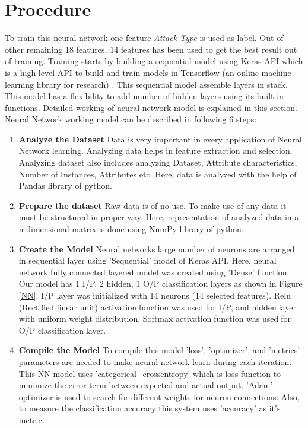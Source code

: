 \section{Procedure} \label{Procedure}
 To train this neural network one feature \textit{Attack Type} is used as label. Out of other remaining 18 features, 14 features has been used to get the best result out of training. Training starts by building a sequential model using Keras API which is a high-level API to build and train models in Tensorflow (an online machine learning library for research) . This sequential model assemble layers in stack. This model has a flexibility to add number of hidden layers using its built in functions. Detailed working of neural network model is explained in this section.
Neural Network working model can be described in following 6 steps:
\begin{enumerate}[label=\textbf{\roman*}.]
\item \textbf{Analyze the Dataset } Data is very important in every application of Neural Network learning. Analyzing data helps in feature extraction and selection. Analyzing dataset also includes analyzing Dataset, Attribute characteristics, Number of Instances, Attributes etc. Here, data is analyzed with the help of Pandas library of python. 
\item \textbf{Prepare the dataset } Raw data is of no use. To make use of any data it must be structured in proper way. Here, representation of analyzed data in a n-dimensional matrix is done using NumPy library of python.

\item \textbf{Create the Model } Neural networks large number of neurons are arranged in sequential layer using 'Sequential' model of Keras API. Here, neural network fully connected layered model was created using 'Dense' function. Our model has 1 I/P, 2 hidden, 1 O/P classification layers as shown in Figure \ref{NN}. I/P layer was initialized with 14 neurons (14 selected features). Relu (Rectified linear unit) activation\textcolor{white}{.}function was\textcolor{white}{.}used for I/P, and hidden\textcolor{white}{.}layer with uniform weight distribution. Softmax activation\textcolor{white}{.}function was used\textcolor{white}{.}for O/P classification\textcolor{white}{.}layer.

\item \textbf{Compile the Model } To compile this model 'loss', 'optimizer', and 'metrics' parameters are needed to make neural network learn during each iteration. This NN model uses 'categorical\_crossentropy' which is loss function to minimize the error term between expected and actual output. 'Adam' optimizer is used to search for different weights for neuron connections. Also, to measure the classification accuracy this system uses 'accuracy' as it's metric. 


\end{enumerate}
